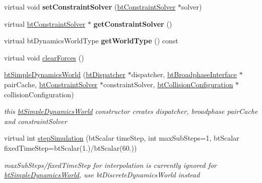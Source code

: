 \begin{DoxyCompactItemize}
\mbox{\label{classbtSimpleDynamicsWorld_a8b198b5865f73a01f4c7deee69e0999c}} 
virtual void {\bfseries set\+Constraint\+Solver} (\hyperlink{classbtConstraintSolver}{bt\+Constraint\+Solver} $\ast$solver)
\item 
\mbox{\label{classbtSimpleDynamicsWorld_a605b993d42c54a5aff9c8e39063031d8}} 
virtual \hyperlink{classbtConstraintSolver}{bt\+Constraint\+Solver} $\ast$ {\bfseries get\+Constraint\+Solver} ()
\item 
\mbox{\label{classbtSimpleDynamicsWorld_af1ae6896a3bb3dc5adf68482b3a1c785}} 
virtual bt\+Dynamics\+World\+Type {\bfseries get\+World\+Type} () const
\item 
virtual void \hyperlink{classbtSimpleDynamicsWorld_ac44c80444f4d6d4e3c2955dd43b7a93a}{clear\+Forces} ()
\item 
\mbox{\label{classbtSimpleDynamicsWorld_a7a82e6d27693ee39d4d2cdf44788ecc8}} 
\hyperlink{classbtSimpleDynamicsWorld_a7a82e6d27693ee39d4d2cdf44788ecc8}{bt\+Simple\+Dynamics\+World} (\hyperlink{classbtDispatcher}{bt\+Dispatcher} $\ast$dispatcher, \hyperlink{classbtBroadphaseInterface}{bt\+Broadphase\+Interface} $\ast$pair\+Cache, \hyperlink{classbtConstraintSolver}{bt\+Constraint\+Solver} $\ast$constraint\+Solver, \hyperlink{classbtCollisionConfiguration}{bt\+Collision\+Configuration} $\ast$collision\+Configuration)
\begin{DoxyCompactList}\small\item\em this \hyperlink{classbtSimpleDynamicsWorld}{bt\+Simple\+Dynamics\+World} constructor creates dispatcher, broadphase pair\+Cache and constraint\+Solver \end{DoxyCompactList}\item 
\mbox{\label{classbtSimpleDynamicsWorld_a43bce5ebc50b034e7c2860a01bba5872}} 
virtual int \hyperlink{classbtSimpleDynamicsWorld_a43bce5ebc50b034e7c2860a01bba5872}{step\+Simulation} (bt\+Scalar time\+Step, int max\+Sub\+Steps=1, bt\+Scalar fixed\+Time\+Step=bt\+Scalar(1.)/bt\+Scalar(60.))
\begin{DoxyCompactList}\small\item\em max\+Sub\+Steps/fixed\+Time\+Step for interpolation is currently ignored for \hyperlink{classbtSimpleDynamicsWorld}{bt\+Simple\+Dynamics\+World}, use bt\+Discrete\+Dynamics\+World instead \end{DoxyCompactList}\item 

\end{DoxyCompactItemize}
